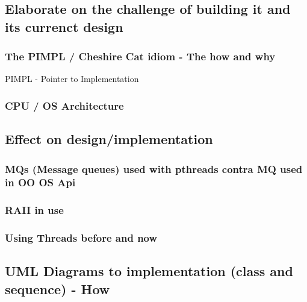 \subsection{Elaborate on the challenge of building it and its currenct design}

\subsubsection{The PIMPL / Cheshire Cat idiom - The how and why}

PIMPL - Pointer to Implementation

\subsubsection{CPU / OS Architecture}

\subsection{Effect on design/implementation}

\subsubsection{MQs (Message queues) used with pthreads contra MQ used in OO OS Api}

\subsubsection{RAII in use}

\subsubsection{Using Threads before and now}

\subsection{UML Diagrams to implementation (class and sequence) - How}
